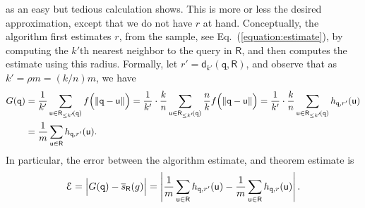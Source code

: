 \documentclass[12pt]{article}
\theoremstyle{remark}{\theorembodyfont{\rm} \newtheorem{remark}[theorem]{Remark}}
\newcommand{\Eqref}[1]{Eq.~(\ref{equation:#1})}
\newcommand{\MakeBig}{\rule[-.2cm]{0cm}{0.4cm}}
\newcommand{\pth}[2][\!]{#1\left({#2}\right)}
\newcommand{\normY}[2]{\left\lVert {#1} - {#2} \right \rVert}
\newcommand{\distPk}[3]{\mathsf{d}_{#3}\pth{#2,#1}}
\newcommand{\cardin}[1]{\left\lvert {#1} \right\rvert}
\newcommand{\query}{\mathtt{q}}
\newcommand{\pntA}{\mathsf{u}}
\newcommand{\distY}[2]{\normY{#1}{#2}}
\renewcommand{\th}{th\xspace}
\newcommand{\PkExt}[4][\!]{{#2}_{\leq #3}\pth[#1]{#4}}
\newcommand{\prob}{\rho}
\newcommand{\sMeasureX}[2]{\overline{s}_{#2}\pth{#1}}
\newcommand{\RSample}{\mathsf{R}}
\newcommand{\Error}{\EuScript{E}}
\begin{document}
as an easy but tedious calculation shows.  This is more or less the
desired approximation, except that we do not have $r$ at
hand. Conceptually, the algorithm first estimates $r$, from the
sample, see \Eqref{estimate}, by computing the $k'$\th nearest
neighbor to the query in $\RSample$, and then computes the estimate
using this radius. Formally, let $r' = \distPk{\RSample}{\query}{k'}$,
and observe that as $k' = \prob m = (k/n) m$, we have  
\begin{align*}
    G(\query)&=\frac{1}{k'}\sum_{\pntA \in \PkExt{\RSample}{k'}{\query}}
    f\pth{\distY{\query}{\pntA} \MakeBig\! } =\frac{1}{k'}\cdot \frac{k}{n}\sum_{\pntA \in
       \PkExt{\RSample}{k'}{\query}} \frac{n}{k}
    f\pth{\distY{\query}{\pntA} \MakeBig\! } =\frac{1}{k'}\cdot \frac{k}{n}\sum_{\pntA \in
       \PkExt{\RSample}{k'}{\query}} h_{\query,r'}(\pntA)\\&=\frac{1}{m}\sum_{\pntA \in \RSample} h_{\query,r'}(\pntA).\end{align*}
In particular, the error between the algorithm estimate, and theorem
estimate is 
\begin{align*}
    \Error =\cardin{ \MakeBig G(\query) - \sMeasureX{g}{\RSample}}=\cardin{\frac{1}{m}\sum_{\pntA \in \RSample} h_{\query,r'}(\pntA) -
       \frac{1}{m}\sum_{\pntA \in \RSample} h_{\query,r}(\pntA)}.
\end{align*}
\end{document}

